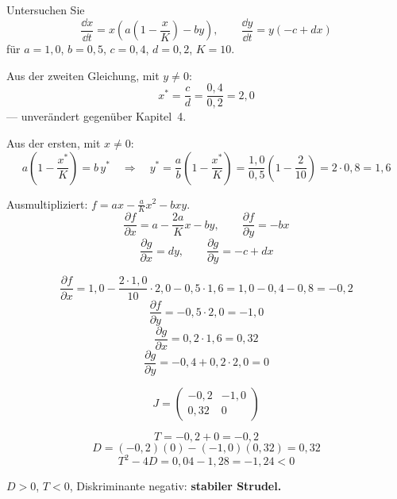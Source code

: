 \begin{aufgabe}
Untersuchen Sie
\[ \frac{\dd x}{\dd t} = x\left(a\left(1-\frac{x}{K}\right) - by\right), \qquad \frac{\dd y}{\dd t} = y(-c+dx) \]
für $a=1{,}0$, $b=0{,}5$, $c=0{,}4$, $d=0{,}2$, $K=10$.

\loesung
{}
Aus der zweiten Gleichung, mit $y \neq 0$:
\[ x^{*} = \frac{c}{d} = \frac{0{,}4}{0{,}2} = 2{,}0 \]
--- unverändert gegenüber Kapitel~4.

Aus der ersten, mit $x \neq 0$:
\[ a\left(1-\frac{x^{*}}{K}\right) = b\,y^{*} \quad\Longrightarrow\quad y^{*} = \frac{a}{b}\left(1-\frac{x^{*}}{K}\right) = \frac{1{,}0}{0{,}5}\left(1-\frac{2}{10}\right) = 2 \cdot 0{,}8 = 1{,}6 \]

\begin{center}
\begin{minipage}{0.86\textwidth}
\end{minipage}
\end{center}

Ausmultipliziert: $f = ax - \frac{a}{K}x^2 - bxy$.
\[ \frac{\partial f}{\partial x} = a - \frac{2a}{K}x - by, \qquad \frac{\partial f}{\partial y} = -bx \]
\[ \frac{\partial g}{\partial x} = dy, \qquad \frac{\partial g}{\partial y} = -c+dx \]

\[ \frac{\partial f}{\partial x} = 1{,}0 - \frac{2\cdot1{,}0}{10}\cdot2{,}0 - 0{,}5\cdot1{,}6 = 1{,}0 - 0{,}4 - 0{,}8 = -0{,}2 \]
\[ \frac{\partial f}{\partial y} = -0{,}5 \cdot 2{,}0 = -1{,}0 \]
\[ \frac{\partial g}{\partial x} = 0{,}2 \cdot 1{,}6 = 0{,}32 \]
\[ \frac{\partial g}{\partial y} = -0{,}4 + 0{,}2\cdot2{,}0 = 0 \]

\[ J = \begin{pmatrix} -0{,}2 & -1{,}0\\ 0{,}32 & 0 \end{pmatrix} \]

\[ T = -0{,}2 + 0 = -0{,}2 \]
\[ D = (-0{,}2)(0) - (-1{,}0)(0{,}32) = 0{,}32 \]
\[ T^2-4D = 0{,}04 - 1{,}28 = -1{,}24 < 0 \]

$D>0$, $T<0$, Diskriminante negativ: \textbf{stabiler Strudel.}


\end{aufgabe}
